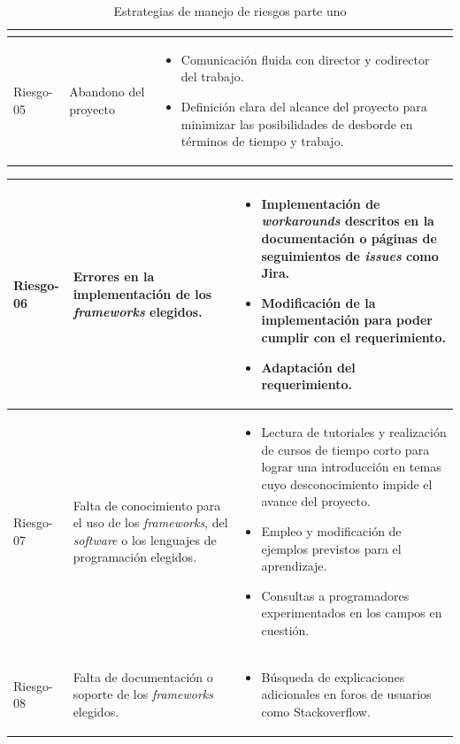 \begin{table}[h]
\begin{tabular}{|C{2cm}|m{3.5cm}|C{8cm}|}
\begin{itemize}
    \end{itemize}\\
    \hline
    Riesgo-05 & Abandono del proyecto &
    \begin{itemize}
        \item Comunicación fluida con director y codirector del trabajo.
        \item Definición clara del alcance del proyecto para minimizar las posibilidades de desborde en términos de tiempo y trabajo.
    \end{itemize}\\
    \hline
\end{tabular}
\caption{Estrategias de manejo de riesgos parte uno}
\label{risk-strategy1}
\end{table}

\begin{table}[h]
    \begin{tabular}{|C{2cm}|m{3.5cm}|C{8cm}|}
    \hline
    Riesgo-06 & Errores en la implementación de los \textit{frameworks} elegidos. &
    \begin{itemize}
        \item Implementación de \textit{workarounds} descritos en la documentación o páginas de seguimientos de \textit{issues} como Jira.
        \item Modificación de la implementación para poder cumplir con el requerimiento.
        \item Adaptación del requerimiento.
    \end{itemize}\\
    \hline
    Riesgo-07 & Falta de conocimiento para el uso de los \textit{frameworks}, del \textit{software} o los lenguajes de programación elegidos. & \begin{itemize}
        \item Lectura de tutoriales y realización de cursos de tiempo corto para lograr una introducción en temas cuyo desconocimiento impide el avance del proyecto.
        \item Empleo y modificación de ejemplos previstos para el aprendizaje.
        \item Consultas a programadores experimentados en los campos en cuestión.
     \end{itemize}\\
     \hline
     Riesgo-08 & Falta de documentación o soporte de los \textit{frameworks} elegidos. & \begin{itemize}
        \item Búsqueda de explicaciones adicionales en foros de usuarios como Stackoverflow.

\end{itemize}
\end{tabular}
\end{table}
